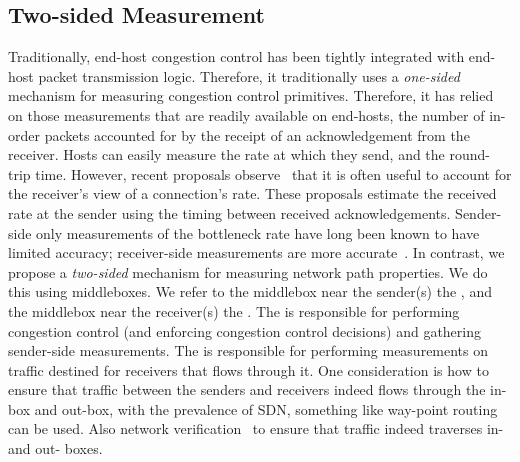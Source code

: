 \subsection{Two-sided Measurement}\label{s:design:twosided}
\begin{outline}
\1 Traditionally, end-host congestion control has been tightly integrated with end-host packet transmission logic.
    \1 Therefore, it traditionally uses a \emph{one-sided} mechanism for measuring congestion control primitives.
    \2 Therefore, it has relied on those measurements that are readily available on end-hosts, \ie the number of in-order packets accounted for by the receipt of an acknowledgement from the receiver.
    \2 Hosts can easily measure the rate at which they send, and the round-trip time.
    \2 However, recent proposals observe~\cite{bbr, sprout, remy, nimbus} that it is often useful to account for the receiver's view of a connection's rate.
        \3 These proposals estimate the received rate at the sender using the timing between received acknowledgements.
        \3 Sender-side only measurements of the bottleneck rate have long been known to have limited accuracy; receiver-side measurements are more accurate~\cite{packet-dynamics, path-properties}.
\1 In contrast, we propose a \emph{two-sided} mechanism for measuring network path properties.
    \2 We do this using middleboxes.
    \2 We refer to the middlebox near the sender(s) the \emph{\inbox}, and the middlebox near the receiver(s) the \emph{\outbox}.
    \2 The \inbox is responsible for performing congestion control (and enforcing congestion control decisions) and gathering sender-side measurements.
    \2 The \outbox is responsible for performing measurements on traffic destined for receivers that flows through it.
    \2 One consideration is how to ensure that traffic between the senders and receivers indeed flows through the in-box and out-box, with the prevalence of SDN, something like way-point routing~\cite{waypoint-routing} can be used. Also network verification~\cite{network-verification} to ensure that traffic indeed traverses in- and out- boxes.
\end{outline}


